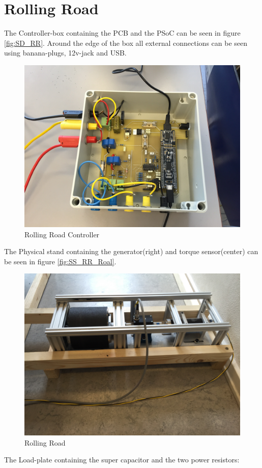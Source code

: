 \section{Rolling Road}
The Controller-box containing the PCB and the PSoC can be seen in figure \vref{fig:SD_RR}. Around the edge of the box all external connections can be seen using banana-plugs, 12v-jack and USB. 

\begin{figure}[H]
	\centering
	\includegraphics[width=0.7\linewidth]{SubPages/Images/SD_RR}
	\caption{Rolling Road Controller}
	\label{fig:SD_RR}
\end{figure}


The Physical stand containing the generator(right) and torque sensor(center) can be seen in figure \vref{fig:SS_RR_Roal}.

\begin{figure}[H]
	\centering
	\includegraphics[width=0.7\linewidth]{SubPages/Images/SS_RR_Roal}
	\caption{Rolling Road}
	\label{fig:SS_RR_Roal}
\end{figure}

The Load-plate containing the super capacitor and the two power resistors:

